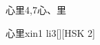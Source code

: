 \begin{entry}{心里}{4,7}{⼼、⾥}
  \begin{phonetics}{心里}{xin1 li3}[][HSK 2]
  \end{phonetics}
\end{entry}
